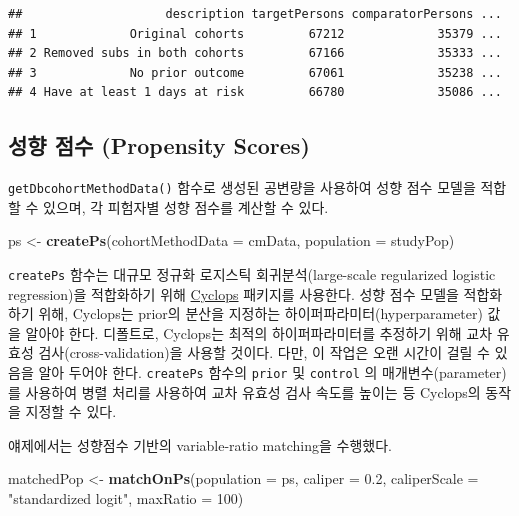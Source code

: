 \documentclass[11pt]{book}
\newenvironment{Shaded}{\begin{snugshade}}{\end{snugshade}}
\newcommand{\KeywordTok}[1]{\textcolor[rgb]{0.13,0.29,0.53}{\textbf{#1}}}
\newcommand{\DataTypeTok}[1]{\textcolor[rgb]{0.13,0.29,0.53}{#1}}
\newcommand{\DecValTok}[1]{\textcolor[rgb]{0.00,0.00,0.81}{#1}}
\newcommand{\FloatTok}[1]{\textcolor[rgb]{0.00,0.00,0.81}{#1}}
\newcommand{\StringTok}[1]{\textcolor[rgb]{0.31,0.60,0.02}{#1}}
\newcommand{\NormalTok}[1]{#1}
\theoremstyle{definition}
\theoremstyle{definition}
\theoremstyle{definition}
\theoremstyle{remark}
\begin{document}
\begin{verbatim}
##                    description targetPersons comparatorPersons ...
## 1             Original cohorts         67212             35379 ...
## 2 Removed subs in both cohorts         67166             35333 ...
## 3             No prior outcome         67061             35238 ...
## 4 Have at least 1 days at risk         66780             35086 ...
\end{verbatim}

\subsection{성향 점수 (Propensity Scores)}\label{--propensity-scores}

\texttt{getDbcohortMethodData()} 함수로 생성된 공변량을 사용하여 성향
점수 모델을 적합할 수 있으며, 각 피험자별 성향 점수를 계산할 수 있다.

\begin{Shaded}
\begin{Highlighting}[]
\NormalTok{ps <-}\StringTok{ }\KeywordTok{createPs}\NormalTok{(}\DataTypeTok{cohortMethodData =}\NormalTok{ cmData, }\DataTypeTok{population =}\NormalTok{ studyPop)}
\end{Highlighting}
\end{Shaded}

\texttt{createPs} 함수는 대규모 정규화 로지스틱 회귀분석(large-scale
regularized logistic regression)을 적합화하기 위해
\href{https://ohdsi.github.io/Cyclops/}{Cyclops} 패키지를 사용한다. 성향
점수 모델을 적합화하기 위해, Cyclops는 prior의 분산을 지정하는
하이퍼파라미터(hyperparameter) 값을 알아야 한다. 디폴트로, Cyclops는
최적의 하이퍼파라미터를 추정하기 위해 교차 유효성
검사(cross-validation)을 사용할 것이다. 다만, 이 작업은 오랜 시간이 걸릴
수 있음을 알아 두어야 한다. \texttt{createPs} 함수의 \texttt{prior} 및
\texttt{control} 의 매개변수(parameter)를 사용하여 병렬 처리를 사용하여
교차 유효성 검사 속도를 높이는 등 Cyclops의 동작을 지정할 수 있다.

얘제에서는 성향점수 기반의 variable-ratio matching을 수행했다.

\begin{Shaded}
\begin{Highlighting}[]
\NormalTok{matchedPop <-}\StringTok{ }\KeywordTok{matchOnPs}\NormalTok{(}\DataTypeTok{population =}\NormalTok{ ps, }\DataTypeTok{caliper =} \FloatTok{0.2}\NormalTok{,}
                        \DataTypeTok{caliperScale =} \StringTok{"standardized logit"}\NormalTok{, }\DataTypeTok{maxRatio =} \DecValTok{100}\NormalTok{)}
\end{Highlighting}
\end{Shaded}
\end{document}
